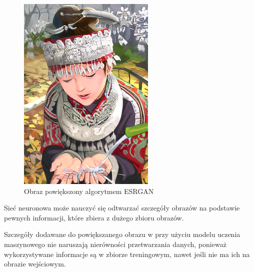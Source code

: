 \begin{figure}[ht]
\begin{minipage}[t]{0.3\linewidth}
        \includegraphics[width=\linewidth]{Rozdziały/02.Podstawy_teoretyczne/Obrazy/comic_ESRGAN_x4.png}
        \caption{Obraz powiększony algorytmem ESRGAN}
        \label{fig:image13}
    \end{minipage}
\end{figure}

Sieć neuronowa może nauczyć się odtwarzać szczegóły obrazów na podstawie pewnych informacji, które zbiera z dużego zbioru obrazów. 

Szczegóły dodawane do powiększanego obrazu w przy użyciu modelu uczenia maszynowego nie naruszają nierówności przetwarzania danych, ponieważ wykorzystywane informacje są w zbiorze treningowym, nawet jeśli nie ma ich na obrazie wejściowym.





